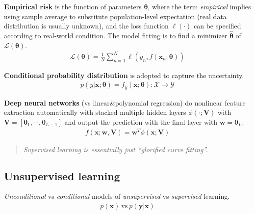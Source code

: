 \textbf{Empirical risk} is the function of parameters $\boldsymbol{\theta}$, 
where the term \textit{empirical} implies using sample average to substitute population-level expectation 
(real data distribution is usually unknown), 
and the loss function $\ell(\cdot)$ can be specified according to real-world condition.
The model fitting is to find a \underline{minimizer} $\hat{\boldsymbol{\theta}}$ of $\mathcal{L}(\boldsymbol{\theta})$.
\begin{gather}
    \mathcal{L}(\boldsymbol{\theta})=\frac{1}{N}\sum_{n=1}^N
    {\ell(y_n,f(\boldsymbol{x}_n;\boldsymbol{\theta}))}
\end{gather}

\textbf{Conditional probability distribution} is adopted to capture the uncertainty.
\begin{gather}
    p(y|\boldsymbol{x};\boldsymbol{\theta})
    =f_y(\boldsymbol{x};\boldsymbol{\theta}):\mathcal{X}\to\mathcal{Y}
\end{gather}

\textbf{Deep neural networks} (vs linear\&polynomial regression) do 
nonlinear feature extraction automatically with stacked multiple hidden layers $\phi(\cdot;\boldsymbol{V})$
with $\boldsymbol{V}=[\boldsymbol{\theta}_1,\cdots,\boldsymbol{\theta}_{L-1}]$ 
and output the prediction with the final layer with $\boldsymbol{w}=\boldsymbol{\theta}_L$.
\begin{gather}
    f(\boldsymbol{x};\boldsymbol{w},\boldsymbol{V})=\boldsymbol{w}^T\phi(\boldsymbol{x};\boldsymbol{V})
\end{gather}

\begin{quote}\textit{
    Supervised learning is essentially just ``glorified curve fitting''.
}\end{quote}

\subsection{Unsupervised learning}

\textit{Unconditional} vs \textit{conditional}
models of \textit{unsupervised} vs \textit{supervised} learning.
\begin{gather}
    p(\boldsymbol{x})~\text{vs}~p(\boldsymbol{y}|\boldsymbol{x})
\end{gather}

